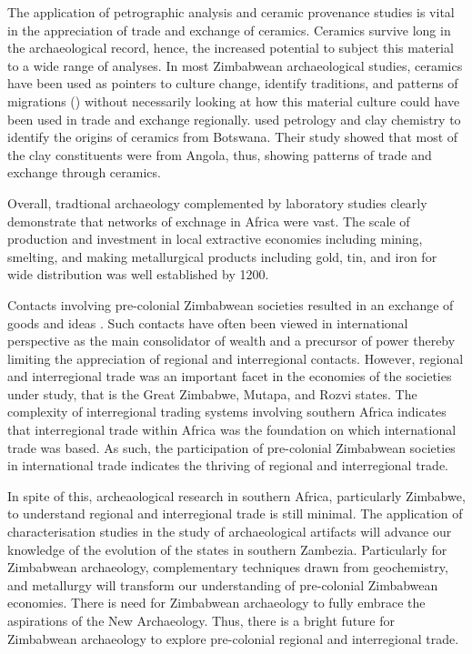 The application of petrographic analysis and ceramic provenance studies is vital in the appreciation of trade and exchange of ceramics. Ceramics survive long in the archaeological record, hence, the increased potential to subject this material to a wide range of analyses. In most Zimbabwean archaeological studies, ceramics have been used as pointers to culture change, identify traditions, and patterns of migrations (\cites{huffman1972}{pikirayi1993}{pikirayi1996}{pwiti1996}) without necessarily looking at how this material culture could have been used in trade and exchange regionally. \textcite{wilmsen2009} used petrology and clay chemistry to identify the origins of ceramics from Botswana. Their study showed that most of the clay constituents were from Angola, thus, showing patterns of trade and exchange through ceramics.

Overall, tradtional archaeology complemented by laboratory studies clearly demonstrate that networks of exchnage in Africa were vast. The scale of production and investment in local extractive economies including mining, smelting, and making metallurgical products including gold, tin, and iron for wide distribution was well established by 1200\CE.

Contacts involving pre-colonial Zimbabwean societies resulted in an exchange of goods and ideas \parencite{pikirayi2017}. Such contacts have often been viewed in international perspective as the main consolidator of wealth \parencite{manyanga2006} and a precursor of power \parencite{kusimba2017} thereby limiting the appreciation of regional and interregional contacts. However, regional and interregional trade was an important facet in the economies of the societies under study, that is the Great Zimbabwe, Mutapa, and Rozvi states. The complexity of interregional trading systems involving southern Africa indicates that interregional trade within Africa was the foundation on which international trade was based. As such, the participation of pre-colonial Zimbabwean societies in international trade indicates the thriving of regional and interregional trade.

In spite of this, archeaological research in southern Africa, particularly Zimbabwe, to understand regional and interregional trade is still minimal. The application of characterisation studies in the study of archaeological artifacts will advance our knowledge of the evolution of the states in southern Zambezia. Particularly for Zimbabwean archaeology, complementary techniques drawn from geochemistry, and metallurgy will transform our understanding of pre-colonial Zimbabwean economies. There is need for Zimbabwean archaeology to fully embrace the aspirations of the New Archaeology. Thus, there is a bright future for Zimbabwean archaeology to explore pre-colonial regional and interregional trade.



